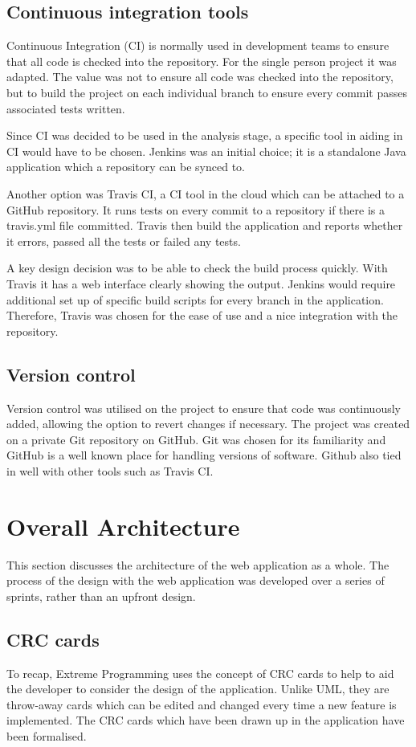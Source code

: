 \subsection{Continuous integration tools}
Continuous Integration (CI) is normally used in development teams to ensure that all code is checked into the repository. For the single person project it was adapted. The value was not to ensure all code was checked into the repository, but to build the project on each individual branch to ensure every commit passes associated tests written.

Since CI was decided to be used in the analysis stage, a specific tool in aiding in CI would have to be chosen. Jenkins was an initial choice; it is a standalone Java application which a repository can be synced to.

Another option was Travis CI, a CI tool in the cloud which can be attached to a GitHub repository. It runs tests on every commit to a repository if there is a travis.yml file committed. Travis then build the application and reports whether it errors, passed all the tests or failed any tests.

A key design decision was to be able to check the build process quickly. With Travis it has a web interface clearly showing the output. Jenkins would require additional set up of specific build scripts for every branch in the application. Therefore, Travis was chosen for the ease of use and a nice integration with the repository.

\subsection{Version control}
Version control was utilised on the project to ensure that code was continuously added, allowing the option to revert changes if necessary. The project was created on a private Git repository on GitHub. Git was chosen for its familiarity and GitHub is a well known place for handling versions of software. Github also tied in well with other tools such as Travis CI.

\section{Overall Architecture}
This section discusses the architecture of the web application as a whole. The process of the design with the web application was developed over a series of sprints, rather than an upfront design.
\subsection{CRC cards}
To recap, Extreme Programming uses the concept of CRC cards to help to aid the developer to consider the design of the application. Unlike UML, they are throw-away cards which can be edited and changed every time a new feature is implemented. The CRC cards which have been drawn up in the application have been formalised.

